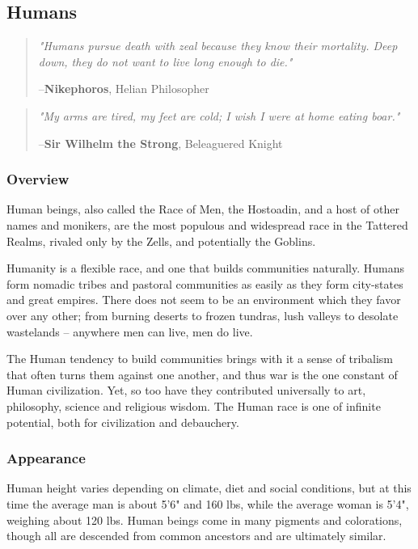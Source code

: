 \documentclass[oneside,11pt,english]{book}
\begin{document}
\subsection{Humans}\label{sec:humans}
\begin{quote}
  \emph{"Humans pursue death with zeal because they know their mortality. 
    Deep down, they do not want to live long enough to die."}\par
  \hfill--\textbf{Nikephoros}, Helian Philosopher 
\end{quote}
\begin{quote} 
  \emph{"My arms are tired, my feet are cold; 
    I wish I were at home eating boar."}\par
  \hfill--\textbf{Sir Wilhelm the Strong}, Beleaguered Knight
\end{quote}
\subsubsection*{Overview}
Human beings, also called the Race of Men, the Hostoadin, and a host of other names and monikers, are the most populous and widespread race in the Tattered Realms, rivaled only by the Zells, and potentially the Goblins. 


Humanity is a flexible race, and one that builds communities naturally. Humans form nomadic tribes and 
pastoral communities as easily as they form city-states and great empires. There does not seem to be an 
environment which they favor over any other; from burning deserts to frozen tundras, lush valleys to 
desolate wastelands -- anywhere men can live, men do live.


The Human tendency to build communities brings with it a sense of tribalism that often turns them 
against one another, and thus war is the one constant of Human civilization. Yet, so too have they 
contributed universally to art, philosophy, science and religious wisdom. The Human race is one of 
infinite potential, both for civilization and debauchery. 


\subsubsection*{Appearance} 
Human height varies depending on climate, diet and social conditions, but at this time the average man is about 5'6" and 160 lbs, while the average woman is 5'4", weighing about 120 lbs. Human beings come in many pigments and colorations, though all are descended from common ancestors and are ultimately 
similar.
\end{document}
